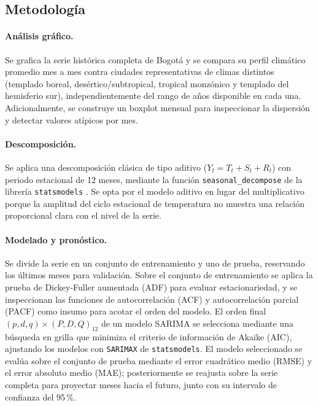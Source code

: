 \subsection{Metodología}

\paragraph{Análisis gráfico.} Se grafica la serie histórica completa de Bogotá y se compara
su perfil climático promedio mes a mes contra ciudades representativas de climas distintos
(templado boreal, desértico/subtropical, tropical monzónico y templado del hemisferio sur),
independientemente del rango de años disponible en cada una. Adicionalmente, se construye un
boxplot mensual para inspeccionar la dispersión y detectar valores atípicos por mes.

\paragraph{Descomposición.} Se aplica una descomposición clásica de tipo aditivo
($Y_t = T_t + S_t + R_t$) con periodo estacional de 12 meses, mediante la función
\texttt{seasonal\_decompose} de la librería \texttt{statsmodels}
\citep{seabold2010statsmodels}. Se opta por el modelo aditivo en lugar del multiplicativo
porque la amplitud del ciclo estacional de temperatura no muestra una relación proporcional
clara con el nivel de la serie.

\paragraph{Modelado y pronóstico.} Se divide la serie en un conjunto de entrenamiento y uno
de prueba, reservando los últimos \TestSizeMonths{} meses para validación. Sobre el conjunto
de entrenamiento se aplica la prueba de Dickey-Fuller aumentada (ADF)
\citep{dickeyfuller1979} para evaluar estacionariedad, y se inspeccionan las funciones de
autocorrelación (ACF) y autocorrelación parcial (PACF) como insumo para acotar el orden del
modelo. El orden final $(p,d,q)\times(P,D,Q)_{12}$ de un modelo SARIMA se selecciona mediante
una búsqueda en grilla que minimiza el criterio de información de Akaike (AIC), ajustando los
modelos con \texttt{SARIMAX} de \texttt{statsmodels}. El modelo seleccionado se evalúa sobre
el conjunto de prueba mediante el error cuadrático medio (RMSE) y el error absoluto medio
(MAE); posteriormente se reajusta sobre la serie completa para proyectar
\FutureHorizonMonths{} meses hacia el futuro, junto con su intervalo de confianza del 95\,\%.

